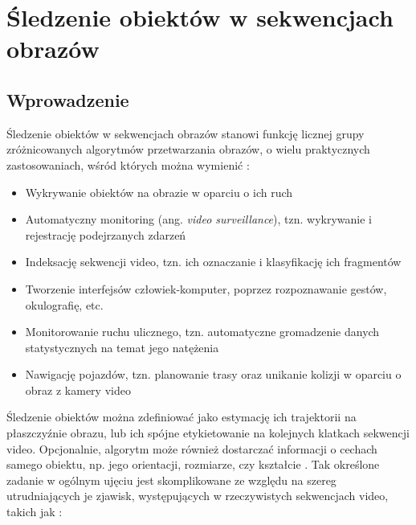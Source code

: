 \chapter{Śledzenie obiektów w sekwencjach obrazów}
\label{cha:Sledzenie_obiektow_w_sekwencjach_obrazow}

\section{Wprowadzenie}
\label{sec:Sledzenie_obiektow_w_sekwencjach_obrazow_wprowadzenie}
Śledzenie obiektów w sekwencjach obrazów stanowi funkcję licznej grupy zróżnicowanych algorytmów przetwarzania obrazów, o wielu praktycznych zastosowaniach, wśród których można wymienić \cite{Yilmaz2006}:

\begin{itemize}

	\item Wykrywanie obiektów na obrazie w oparciu o ich ruch
	\item Automatyczny monitoring (ang. \textit{video surveillance}), tzn. wykrywanie i rejestrację podejrzanych zdarzeń
	\item Indeksację sekwencji video, tzn. ich oznaczanie i klasyfikację ich fragmentów
	\item Tworzenie interfejsów człowiek-komputer, poprzez rozpoznawanie gestów, okulografię, etc.
	\item Monitorowanie ruchu ulicznego, tzn. automatyczne gromadzenie danych statystycznych na temat jego natężenia
	\item Nawigację pojazdów, tzn. planowanie trasy oraz unikanie kolizji w oparciu o obraz z kamery video

\end{itemize}	
	
Śledzenie obiektów można zdefiniować jako estymację ich trajektorii na  płaszczyźnie obrazu, lub ich spójne etykietowanie na kolejnych klatkach sekwencji video. Opcjonalnie, algorytm może również dostarczać informacji o cechach samego obiektu, np. jego orientacji, rozmiarze, czy kształcie \cite{Yilmaz2006}. Tak określone zadanie w ogólnym ujęciu jest skomplikowane ze względu na szereg utrudniających je zjawisk, występujących w rzeczywistych sekwencjach video, takich jak \cite{Yilmaz2006}:

